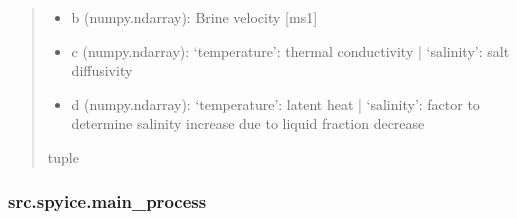 \documentclass[a4paper,11pt,english,openany]{sphinxmanual}
\begin{document}
\begin{fulllineitems}
\begin{quote}
\begin{description}
\begin{description}
\begin{itemize}
\item {} 
\sphinxAtStartPar
b (numpy.ndarray): Brine velocity {[}ms\sphinxhyphen{}1{]}

\item {} 
\sphinxAtStartPar
c (numpy.ndarray): ‘temperature’: thermal conductivity | ‘salinity’: salt diffusivity

\item {} 
\sphinxAtStartPar
d (numpy.ndarray): ‘temperature’: latent heat | ‘salinity’: factor to determine salinity increase due to liquid fraction decrease

\end{itemize}

\end{description}


\sphinxAtStartPar
tuple

\end{description}\end{quote}

\end{fulllineitems}


\sphinxstepscope


\subsubsection{src.spyice.main\_process}
\label{\detokenize{api/spyice.main_process:module-src.spyice.main_process}}\label{\detokenize{api/spyice.main_process:src-spyice-main-process}}\label{\detokenize{api/spyice.main_process::doc}}
\end{document}
